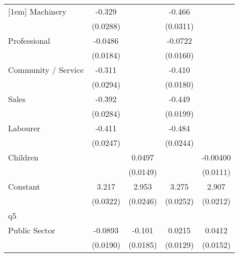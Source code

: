 {\begin{tabular}{l*{4}{c}}
[1em]
Machinery           &      -0.329\sym{***}&                     &      -0.466\sym{***}&                     \\
                    &    (0.0288)         &                     &    (0.0311)         &                     \\
[1em]
Professional        &     -0.0486\sym{**} &                     &     -0.0722\sym{***}&                     \\
                    &    (0.0184)         &                     &    (0.0160)         &                     \\
[1em]
Community / Service &      -0.311\sym{***}&                     &      -0.410\sym{***}&                     \\
                    &    (0.0294)         &                     &    (0.0180)         &                     \\
[1em]
Sales               &      -0.392\sym{***}&                     &      -0.449\sym{***}&                     \\
                    &    (0.0284)         &                     &    (0.0199)         &                     \\
[1em]
Labourer            &      -0.411\sym{***}&                     &      -0.484\sym{***}&                     \\
                    &    (0.0247)         &                     &    (0.0244)         &                     \\
[1em]
Children            &                     &      0.0497\sym{***}&                     &    -0.00400         \\
                    &                     &    (0.0149)         &                     &    (0.0111)         \\
[1em]
Constant            &       3.217\sym{***}&       2.953\sym{***}&       3.275\sym{***}&       2.907\sym{***}\\
                    &    (0.0322)         &    (0.0246)         &    (0.0252)         &    (0.0212)         \\
\hline
q5                  &                     &                     &                     &                     \\
Public Sector       &     -0.0893\sym{***}&      -0.101\sym{***}&      0.0215         &      0.0412\sym{**} \\
                    &    (0.0190)         &    (0.0185)         &    (0.0129)         &    (0.0152)         \\

\end{tabular}}
